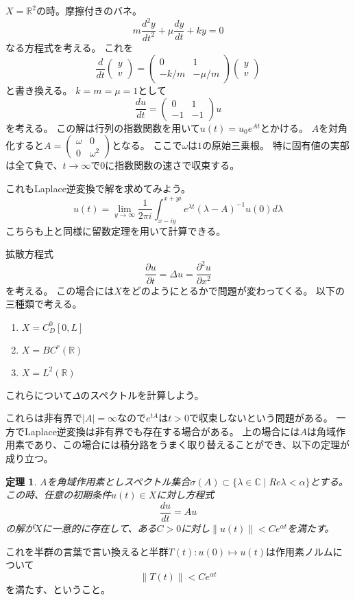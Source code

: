 \documentclass{jsarticle}
\newtheorem{thm}{定理}
\newcommand{\C}{\mathbb{C}}
\newcommand{\R}{\mathbb{R}}
\newcommand{\abs}[1]{|#1|}
\newcommand{\norm}[1]{\|#1\|}
\begin{document}
$X=\R^2$の時。摩擦付きのバネ。
\[
m\frac{d^2y}{dt^2}+\mu\frac{dy}{dt}+ky=0
\]
なる方程式を考える。
これを
\[
\frac{d}{dt}\begin{pmatrix}y\\v\end{pmatrix}=\begin{pmatrix}0&1\\-k/m&-\mu/m\end{pmatrix}\begin{pmatrix}y\\v\end{pmatrix}
\]
と書き換える。
$k=m=\mu=1$として
\[
\frac{du}{dt}=\begin{pmatrix}0&1\\-1&-1\end{pmatrix}u
\]
を考える。
この解は行列の指数関数を用いて$u(t)=u_0e^{At}$とかける。
$A$を対角化すると$A=\begin{pmatrix}\omega&0\\0&\omega^2\end{pmatrix}$となる。
ここで$\omega$は$1$の原始三乗根。
特に固有値の実部は全て負で、$t\to\infty$で$0$に指数関数の速さで収束する。

これもLaplace逆変換で解を求めてみよう。
\[
u(t)=\lim_{y\to\infty}\frac{1}{2\pi i}\int^{x+yi}_{x-iy}e^{\lambda t}(\lambda-A)^{-1}u(0)d\lambda
\]
こちらも上と同様に留数定理を用いて計算できる。

拡散方程式
\[
\frac{\partial u}{\partial t}=\Delta u=\frac{\partial^2u}{\partial x^2}
\]
を考える。
この場合には$X$をどのようにとるかで問題が変わってくる。
以下の三種類で考える。
\begin{enumerate}
\item $X=C^0_D[0,L]$
\item $X=BC^r(\R)$
\item $X=L^2(\R)$
\end{enumerate}

これらについて$\Delta$のスペクトルを計算しよう。

これらは非有界で$\abs{A}=\infty$なので$e^{tA}$は$t>0$で収束しないという問題がある。
一方でLaplace逆変換は非有界でも存在する場合がある。
上の場合には$A$は角域作用素であり、この場合には積分路をうまく取り替えることができ、以下の定理が成り立つ。
\begin{thm}
$A$を角域作用素としスペクトル集合$\sigma(A)\subset\{\lambda\in\C\mid Re\lambda<\alpha\}$とする。
この時、任意の初期条件$u(t)\in X$に対し方程式
\[
\frac{du}{dt}=Au
\]
の解が$X$に一意的に存在して、ある$C>0$に対し$\norm{u(t)}<Ce^{\alpha t}$を満たす。
\end{thm}
これを半群の言葉で言い換えると半群$T(t)\colon u(0)\mapsto u(t)$は作用素ノルムについて
\[
\norm{T(t)}<Ce^{\alpha t}
\]
を満たす、ということ。
\end{document}
